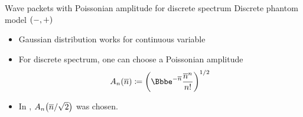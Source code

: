 \documentclass[8pt]{beamer}
\begin{document}
\begin{frame}%
{Wave packets with Poissonian amplitude for discrete spectrum}%
{Discrete phantom model ${\left(-,+\right)}$}
\begin{itemize}
\item Gaussian distribution works for continuous variable

\item For discrete spectrum, one can choose a Poissonian amplitude
\begin{align}
\rfun{A_n}{\overline{n}} \coloneqq
\rbr{\ee^{-\overline{n}}\frac{\overline{n}^n}{n!}}^{1/2}
\end{align}
\item In ,
${A_n}\mathopen{}\left(\overline{n}/\sqrt{2}\right)\mathclose{}$ was chosen.

\end{itemize}
\end{frame}
\end{document}
